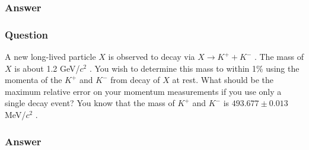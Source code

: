 \subsubsection{Answer}



\subsubsection{Question}

A new long-lived particle $X$ is observed to decay via $X \to K^+ + K^-$ . The mass of $X$ is about 1.2 GeV/$c^2$ . You wish to determine this mass to within 1\% using the momenta of the $K^+$ and $K^-$ from decay of $X$ at rest. What should be the maximum relative error on your momentum measurements if you use only a single decay event? You know that the mass of $K^+$ and $K^-$ is $493.677\pm0.013$MeV/$c^2$ .

\subsubsection{Answer}

